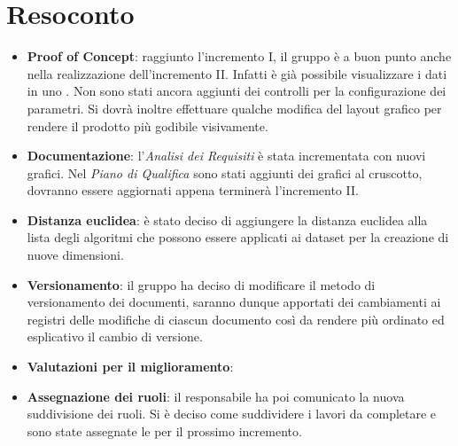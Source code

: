 \section{Resoconto}
\begin{itemize}
\item \textbf{Proof of Concept}: raggiunto l'incremento I, il gruppo è a buon punto anche nella realizzazione dell'incremento II. Infatti è già possibile visualizzare i dati in uno . Non sono stati ancora aggiunti dei controlli per la configurazione dei parametri. Si dovrà inoltre effettuare qualche modifica del layout grafico per rendere il prodotto più godibile visivamente. 

\item\textbf{Documentazione}: l'\textit{Analisi dei Requisiti} è stata incrementata con nuovi grafici. Nel \textit{Piano di Qualifica} sono stati aggiunti dei grafici al cruscotto, dovranno essere aggiornati appena terminerà l'incremento II.

\item\textbf{Distanza euclidea}: è stato deciso di aggiungere la distanza euclidea alla lista degli algoritmi che possono essere applicati ai dataset per la creazione di nuove dimensioni.

\item\textbf{Versionamento}: il gruppo ha deciso di modificare il metodo di versionamento dei documenti, saranno dunque apportati dei cambiamenti ai registri delle modifiche di ciascun documento così da rendere più ordinato ed esplicativo il cambio di versione.

\item\textbf{Valutazioni per il miglioramento}: 

\item \textbf{Assegnazione dei ruoli}: il responsabile ha poi comunicato la nuova suddivisione dei ruoli. Si è deciso come suddividere i lavori da completare e sono state assegnate le  per il prossimo incremento.
\end{itemize}

\newpage